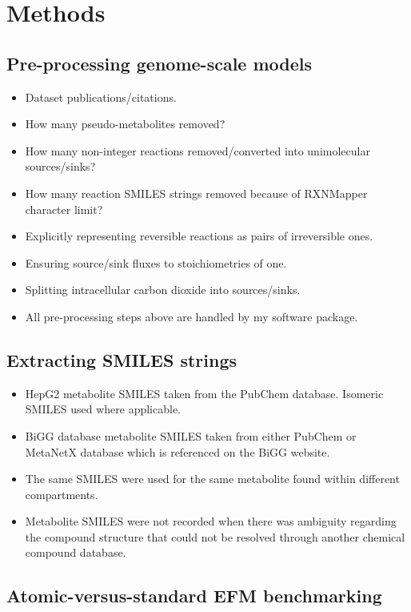 \documentclass[11pt]{article}
\begin{document}
\section{Methods}

\subsection{Pre-processing genome-scale models}

\begin{itemize}
    \item Dataset publications/citations.
    \item How many pseudo-metabolites removed?
    \item How many non-integer reactions removed/converted into unimolecular sources/sinks?
    \item How many reaction SMILES strings removed because of RXNMapper character limit?
    \item Explicitly representing reversible reactions as pairs of irreversible ones.
    \item Ensuring source/sink fluxes to stoichiometries of one.
    \item Splitting intracellular carbon dioxide into sources/sinks.
    \item All pre-processing steps above are handled by my software package.
\end{itemize}

\subsection{Extracting SMILES strings}

\begin{itemize}
    \item HepG2 metabolite SMILES taken from the PubChem database. Isomeric SMILES used where applicable.
    \item BiGG database metabolite SMILES taken from either PubChem or MetaNetX database which is referenced on the BiGG website.
    \item The same SMILES were used for the same metabolite found within different compartments.
    \item Metabolite SMILES were not recorded when there was ambiguity regarding the compound structure that could not be resolved through another chemical compound database.
\end{itemize}

\subsection{Atomic-versus-standard EFM benchmarking}
\end{document}
